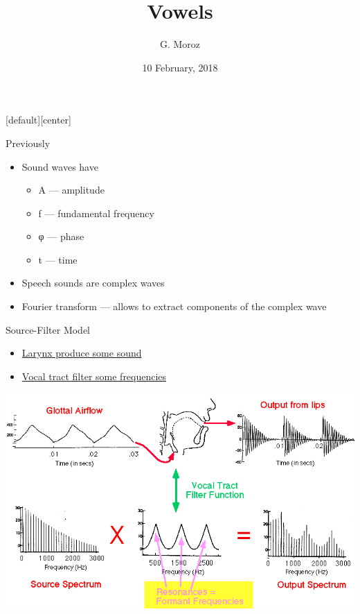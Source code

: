 [default][center]
\title[]{Vowels}
\author[]{G. Moroz}
\date{10 February, 2018}

\frame{\titlepage}

\begin{frame}{Previously}
\begin{itemize}
\item Sound waves have
\begin{itemize}
\item A --- amplitude
\item f --- fundamental frequency
\item φ --- phase
\item t --- time
\end{itemize}
\item Speech sounds are complex waves
\item Fourier transform --- allows to extract components of the complex wave
\end{itemize}
\end{frame}


\begin{frame}{Source-Filter Model}
\begin{itemize}
\item \href{https://raw.githubusercontent.com/agricolamz/2018_m_Instrumental_Phonetics/master/docs/materials/larynx.mp4}{Larynx produce some sound}
\item \href{https://raw.githubusercontent.com/agricolamz/2018_m_Instrumental_Phonetics/master/docs/materials/MRI-speech.mp4}{Vocal tract filter some frequencies}
\end{itemize}
\includegraphics[width=0.95\linewidth]{01-source-filter.png}
\end{frame}

